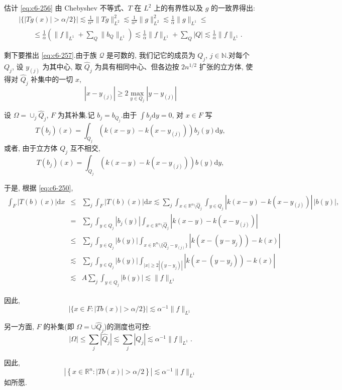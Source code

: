 估计 \eqref{eq:c6-256} 由 Chebyshev 不等式、$T$ 在 $L^2$ 上的有界性以及 $g$ 的一致界得出:
\[
\begin{array}{l}
|\{|Tg(x)| > \alpha/2\}| \lesssim \frac{1}{\alpha^2} \|Tg\|^2_{L^2} \lesssim \frac{1}{\alpha^2} \|g\|^2_{L^2} \lesssim \frac{1}{\alpha} \|g\|_{L^1} \leq \\
\qquad \leq \frac{1}{\alpha} \left(\|f\|_{L^1} + \sum_Q \|b_Q\|_{L^1}\right) \lesssim \frac{1}{\alpha} \|f\|_{L^1} + \sum_Q |Q| \lesssim \frac{1}{\alpha} \|f\|_{L^1}.
\end{array}
\]

剩下要推出 \eqref{eq:c6-257}.由于族 $\mathcal{Q}$ 是可数的, 我们记它的成员为 $Q_j$, $j \in \mathbb{N}$.对每个 $Q_j$, 设 $y_{(j)}$ 为其中心, 取 $\hat{Q}_j$ 为具有相同中心、但各边按 $2n^{1/2}$ 扩张的立方体, 使得对 $\hat{Q}_j$ 补集中的一切 $x$,
\[
|x - y_{(j)}| \geq 2 \max_{y \in Q_j} |y - y_{(j)}|
\]

设 $\Omega = \cup_j \hat{Q}_j$, $F$ 为其补集.记 $b_j = b_{Q_j}$.由于 $\int b_j \mathrm{d}y = 0$, 对 $x \in F$ 写
\[
T(b_j)(x) = \int_{Q_j} \left(k(x-y) - k(x - y_{(j)})\right) b_j(y) \mathrm{d}y,
\]
或者, 由于立方体 $Q_j$ 互不相交,
\[
T(b_j)(x) = \int_{Q_j} \left(k(x-y) - k(x - y_{(j)})\right) b(y) \mathrm{d}y,
\]

于是, 根据 \eqref{eq:c6-250},
\[
\begin{array}{rcl}
\int_F |T(b)(x)| \mathrm{d}x &\leq& \sum_j \int_F |T(b)(x)| \mathrm{d}x \lesssim \sum_j \int_{x \in \mathbb{R}^n \setminus \hat{Q}_j} \int_{y \in Q_j} |k(x-y) - k(x - y_{(j)})|\, |b(y)|, \\
&=& \sum_j \int_{y \in Q_j} |b_j(y)| \int_{x \in \mathbb{R}^n \setminus \hat{Q}_j} |k(x-y) - k(x - y_{(j)})| \\
&\leq& \sum_j \int_{y \in Q_j} |b(y)| \int_{x \in \mathbb{R}^n \setminus \{\hat{Q}_j - y_{(j)}\}} |k(x - (y - y_j)) - k(x)| \\
&\lesssim& \sum_j \int_{y \in Q_j} |b(y)| \int_{|x| \geq 2|(y - y_j)|} |k(x - (y - y_j)) - k(x)| \\
&\lesssim& A \sum_j \int_{y \in Q_j} |b(y)| \lesssim \|f\|_{L^1}
\end{array}
\]

因此,
\[
|\{x \in F: |Tb(x)| > \alpha/2\}| \lesssim \alpha^{-1} \|f\|_{L^1}
\]

另一方面, $F$ 的补集(即 $\Omega = \cup \hat{Q}_j$)的测度也可控:
\[
|\Omega| \leq \sum_j |\hat{Q}_j| \lesssim \sum_j |Q_j| \lesssim \alpha^{-1} \|f\|_{L^1}.
\]

因此,
\[
\left|\left\{x \in \mathbb{R}^n: |Tb(x)| > \alpha/2\right\}\right| \lesssim \alpha^{-1} \|f\|_{L^1}
\]
如所愿.

